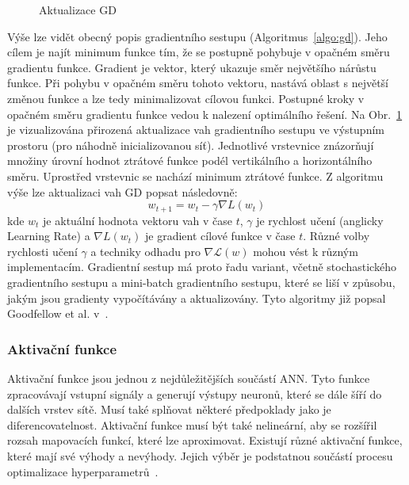 \begin{figure}[h]
\begin{minipage}{0.4\textwidth}
        \caption{Aktualizace \gls{GD}~\cite{gradientdescent}}
        \label{fig:gd}
    \end{minipage}
\end{figure}

Výše lze vidět obecný popis gradientního sestupu (Algoritmus~\ref{algo:gd}).
Jeho cílem je najít minimum funkce tím, že se postupně pohybuje v opačném směru
gradientu funkce. Gradient je vektor, který ukazuje směr největšího nárůstu
funkce. Při pohybu v opačném směru tohoto vektoru, nastává oblast s největší
změnou funkce a lze tedy minimalizovat cílovou funkci. Postupné kroky v opačném
směru gradientu funkce vedou k nalezení optimálního řešení. Na Obr.~\ref{fig:gd}
je vizualizována přirozená aktualizace vah gradientního sestupu ve výstupním
prostoru (pro náhodně inicializovanou síť). Jednotlivé vrstevnice znázorňují
množiny úrovní hodnot ztrátové funkce podél vertikálního a horizontálního směru.
Uprostřed vrstevnic se nachází minimum ztrátové funkce. Z algoritmu výše lze
aktualizaci vah GD popsat následovně:
\begin{equation}
    w_{t+1} = w_t - \gamma \nabla L(w_t)
\end{equation}
kde $w_t$ je aktuální hodnota vektoru vah v čase $t$, $\gamma$ je rychlost učení
(anglicky Learning Rate) a $\nabla L(w_t)$ je gradient cílové funkce v čase $t$.
Různé volby rychlosti učení $\gamma$ a techniky odhadu pro
$\nabla\mathcal{L}(w)$ mohou vést k různým implementacím. Gradientní sestup má
proto řadu variant, včetně stochastického gradientního sestupu a mini-batch
gradientního sestupu, které se liší v způsobu, jakým jsou gradienty vypočítávány
a aktualizovány. Tyto algoritmy již popsal Goodfellow et al.
v~\cite{Goodfellow2016}.

\subsubsection{Aktivační funkce}
Aktivační funkce jsou jednou z nejdůležitějších součástí \gls{ANN}. Tyto funkce
zpracovávají vstupní signály a generují výstupy neuronů, které se dále šíří do
dalších vrstev sítě. Musí také splňovat některé předpoklady jako je
diferencovatelnost. Aktivační funkce musí být také nelineární, aby se rozšířil
rozsah mapovacích funkcí, které lze aproximovat. Existují různé aktivační
funkce, které mají své výhody a nevýhody. Jejich výběr je podstatnou součástí
procesu optimalizace hyperparametrů~\cite{sharma2017,Goodfellow2016}.

